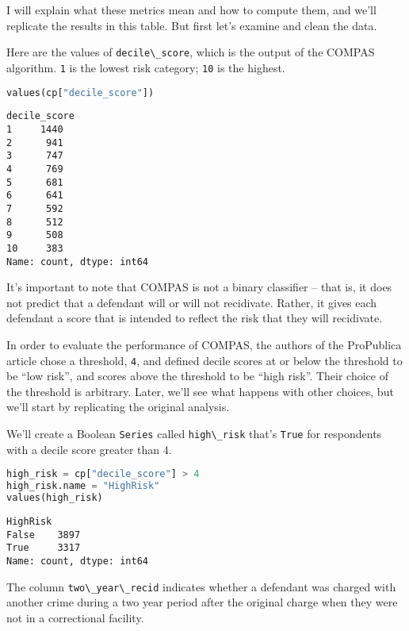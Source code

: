 I will explain what these metrics mean and how to compute them, and
we'll replicate the results in this table. But first let's examine and
clean the data.

Here are the values of \passthrough{\lstinline!decile\_score!}, which is
the output of the COMPAS algorithm. \passthrough{\lstinline!1!} is the
lowest risk category; \passthrough{\lstinline!10!} is the highest.

\begin{lstlisting}[language=Python,style=source]
values(cp["decile_score"])
\end{lstlisting}

\begin{lstlisting}[style=output]
decile_score
1     1440
2      941
3      747
4      769
5      681
6      641
7      592
8      512
9      508
10     383
Name: count, dtype: int64
\end{lstlisting}

It's important to note that COMPAS is not a binary classifier -- that
is, it does not predict that a defendant will or will not recidivate.
Rather, it gives each defendant a score that is intended to reflect the
risk that they will recidivate.

In order to evaluate the performance of COMPAS, the authors of the
ProPublica article chose a threshold, \passthrough{\lstinline!4!}, and
defined decile scores at or below the threshold to be ``low risk'', and
scores above the threshold to be ``high risk''. Their choice of the
threshold is arbitrary. Later, we'll see what happens with other
choices, but we'll start by replicating the original analysis.

We'll create a Boolean \passthrough{\lstinline!Series!} called
\passthrough{\lstinline!high\_risk!} that's
\passthrough{\lstinline!True!} for respondents with a decile score
greater than 4.

\begin{lstlisting}[language=Python,style=source]
high_risk = cp["decile_score"] > 4
high_risk.name = "HighRisk"
values(high_risk)
\end{lstlisting}

\begin{lstlisting}[style=output]
HighRisk
False    3897
True     3317
Name: count, dtype: int64
\end{lstlisting}

The column \passthrough{\lstinline!two\_year\_recid!} indicates whether
a defendant was charged with another crime during a two year period
after the original charge when they were not in a correctional facility.

